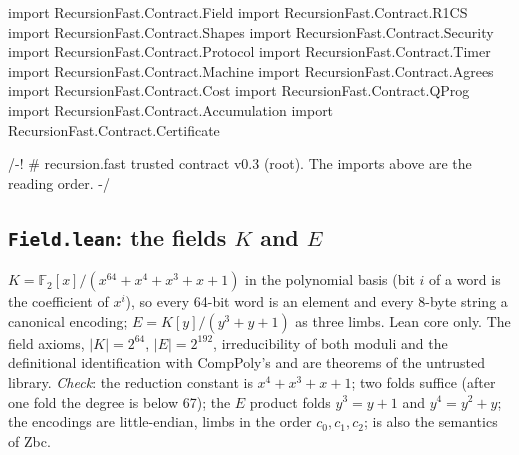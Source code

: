 \begin{leancode}[fontsize=\scriptsize,label={\footnotesize RecursionFast/Contract.lean}]
import RecursionFast.Contract.Field
import RecursionFast.Contract.R1CS
import RecursionFast.Contract.Shapes
import RecursionFast.Contract.Security
import RecursionFast.Contract.Protocol
import RecursionFast.Contract.Timer
import RecursionFast.Contract.Machine
import RecursionFast.Contract.Agrees
import RecursionFast.Contract.Cost
import RecursionFast.Contract.QProg
import RecursionFast.Contract.Accumulation
import RecursionFast.Contract.Certificate

/-! # recursion.fast trusted contract v0.3 (root). The imports above are the reading order. -/
\end{leancode}

\subsection{\texttt{Field.lean}: the fields \texorpdfstring{$K$}{K} and \texorpdfstring{$E$}{E}}

$K=\mathbb{F}_2[x]/(x^{64}+x^4+x^3+x+1)$ in the polynomial basis (bit $i$ of a word is the
coefficient of $x^i$), so every 64-bit word is an element and every 8-byte string a canonical
encoding; $E=K[y]/(y^3+y+1)$ as three limbs. Lean core only. The field axioms, $|K|=2^{64}$,
$|E|=2^{192}$, irreducibility of both moduli and the definitional identification with CompPoly's
 and  are theorems of the untrusted library. \emph{Check}: the reduction
constant  is $x^4+x^3+x+1$; two folds suffice (after one fold the degree is below 67);
the $E$ product folds $y^3=y+1$ and $y^4=y^2+y$; the encodings are little-endian, limbs in the order
$c_0,c_1,c_2$;  is also the semantics of Zbc.

